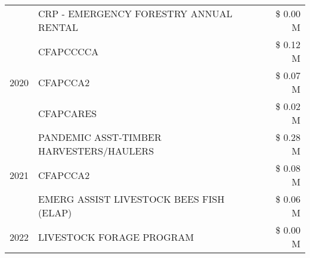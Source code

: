 \begin{tabular}{llr}
 & CRP - EMERGENCY FORESTRY ANNUAL RENTAL & \$ 0.00 M \\
\cline{1-3}
\multirow[t]{3}{*}{2020} & CFAPCCCCA & \$ 0.12 M \\
 & CFAPCCA2 & \$ 0.07 M \\
 & CFAPCARES & \$ 0.02 M \\
\cline{1-3}
\multirow[t]{3}{*}{2021} & PANDEMIC ASST-TIMBER HARVESTERS/HAULERS & \$ 0.28 M \\
 & CFAPCCA2 & \$ 0.08 M \\
 & EMERG ASSIST LIVESTOCK BEES FISH (ELAP) & \$ 0.06 M \\
\cline{1-3}
2022 & LIVESTOCK FORAGE PROGRAM & \$ 0.00 M \\
\cline{1-3}
\bottomrule
\end{tabular}
